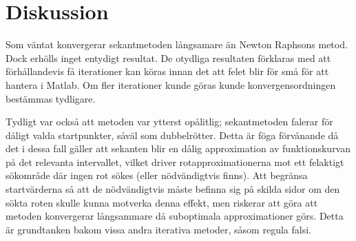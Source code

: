 \documentclass[12pt]{article}
\begin{document}
\section{Diskussion}
Som väntat konvergerar sekantmetoden långsamare än Newton Raphsons metod. Dock erhölls inget entydigt resultat. De otydliga resultaten förklaras med att förhållandevis få iterationer kan köras innan det att felet blir för små för att hantera i Matlab. Om fler iterationer kunde göras kunde konvergensordningen bestämmas tydligare.


Tydligt var också att metoden var ytterst opålitlig; sekantmetoden falerar för dåligt valda startpunkter, såväl som dubbelrötter. Detta är föga förvånande då det i dessa fall gäller att sekanten blir en dålig approximation av funktionskurvan på det relevanta intervallet, vilket driver rotapproximationerna mot ett felaktigt sökområde där ingen rot sökes (eller nödvändigtvis finns). Att begränsa startvärderna så att de nödvändigtvis måste befinna sig på skilda sidor om den sökta roten skulle kunna motverka denna effekt, men riskerar att göra att metoden konvergerar långsammare då suboptimala approximationer görs. Detta är grundtanken bakom vissa andra iterativa metoder, såsom regula falsi.
\end{document}
